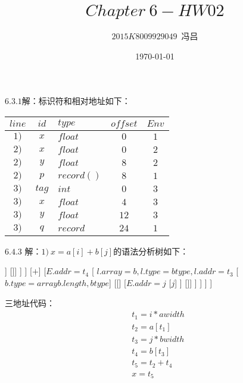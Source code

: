 \documentclass[UTF8,noindent]{ctexart}
\title{$Chapter\ 6-HW02$}
\author{$2015K8009929049$\ 冯吕}
\date{\today}
\begin{document}
\maketitle
{}
$6.3.1$解：标识符和相对地址如下：
\begin{center}
\begin{tabular}{|c|c|l|c|c|}
  \hline
  $line$ & $id$ & $type$ & $offset$ & $Env$ \\
  \hline
$1)$ & $x$ & $float$ & $0$ & $1$\\
\hline
$2)$ & $x$ & $float$ & $0$ & $2$\\
\hline
$2)$ & $y$ & $float$ & $8$ & $2$\\
\hline
$2)$ & $p$& $record()$ & $8$ & $1$\\
\hline
$3)$ & $tag$ & $int$ & $0$ & $3$\\
\hline
$3)$ & $x$ & $float$ & $4$ &$3$\\
\hline
$3)$ & $y$ &$float$ & $12$ & $3$\\
\hline
$3)$ & $q$ & $record$ &$24$ & $1$\\
\hline
\end{tabular}
\end{center}

$6.4.3$ 解：$1)\ x= a[i] + b[j]$的语法分析树如下：
\begin{center}
\begin{forest}
  [{$S$}
	  [{$x$}]
	  [{$=$}]
	  [{$E.addr= t_5$}
		[{$E.addr = t_2$}
		  [
			{$L.array = a, L.type =atype, L.addr = t_1$}
			[{$a.type = array(a.length, atype)$}]
			[{$[$}]
			  [{$E.addr=i$}
				[{$i$}]
			  ]
		  [{$]$}]
		  ]
		]
		[{$+$}]
		[{$E.addr= t_4$}
		  [{ $l.array = b, l.type = btype, l.addr = t_3$ }
			[{$b.type = array{b.length, btype}$}]
			[{$[$}]
			  [{$E.addr = j$}
				[{$j$}]
			  ]
			[{$]$}]
		  ]
		]
	  ]
	]
\end{forest}
\end{center}
三地址代码：
\begin{align*}
 & t_1 = i * awidth\\
 & t_2 = a[t_1]\\
 & t_3 = j * bwidth\\
 & t_4 = b[t_3]\\
 & t_5 = t_2 + t_4\\
 & x = t_5
\end{align*}
\end{document}
